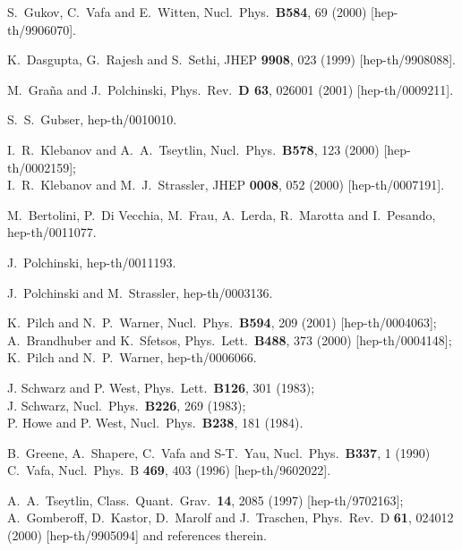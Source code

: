 \documentclass[a4paper,12pt]{article}
\renewcommand{\=}[1]{\bar{#1}}
\begin{document}
\begin{thebibliography}{10}
S.~Gukov, C.~Vafa and E.~Witten,
Nucl.\ Phys.\  {\bf B584}, 69 (2000)
[hep-th/9906070].

K.~Dasgupta, G.~Rajesh and S.~Sethi,
JHEP {\bf 9908}, 023 (1999)
[hep-th/9908088].

M.~Gra\~na and J.~Polchinski,
Phys.\ Rev.\ {\bf D 63}, 026001 (2001)
[hep-th/0009211].

S.~S.~Gubser,
hep-th/0010010.

I.~R.~Klebanov and A.~A.~Tseytlin,
Nucl.\ Phys.\  {\bf B578}, 123 (2000)
[hep-th/0002159];\\
I.~R.~Klebanov and M.~J.~Strassler,
JHEP {\bf 0008}, 052 (2000)
[hep-th/0007191].

M.~Bertolini, P.~Di Vecchia, M.~Frau, A.~Lerda, R.~Marotta and I.~Pesando,
hep-th/0011077.

J.~Polchinski,
hep-th/0011193.

J.~Polchinski and M.~Strassler, hep-th/0003136.

K.~Pilch and N.~P.~Warner,
Nucl.\ Phys.\ {\bf B594}, 209 (2001)
[hep-th/0004063];\\
A.~Brandhuber and K.~Sfetsos,
Phys.\ Lett.\ {\bf B488}, 373 (2000)
[hep-th/0004148];\\
K.~Pilch and N.~P.~Warner,
hep-th/0006066.

J. Schwarz and P. West, Phys.\ Lett.\ {\bf B126}, 301 (1983);\\
J. Schwarz, Nucl.\ Phys.\ {\bf B226}, 269 (1983);\\
P. Howe and P. West, Nucl.\ Phys.\ {\bf B238}, 181 (1984).

B.~Greene, A.~Shapere, C.~Vafa and S-T.~Yau,
Nucl.\ Phys.\ {\bf B337}, 1 (1990)
C.~Vafa,
Nucl.\ Phys.\ B {\bf 469}, 403 (1996)
[hep-th/9602022].

A.~A.~Tseytlin,
Class.\ Quant.\ Grav.\  {\bf 14}, 2085 (1997)
[hep-th/9702163];\\
A.~Gomberoff, D.~Kastor, D.~Marolf and J.~Traschen,
Phys.\ Rev.\ D {\bf 61}, 024012 (2000)
[hep-th/9905094] and references therein.


\end{thebibliography}
\end{document}
